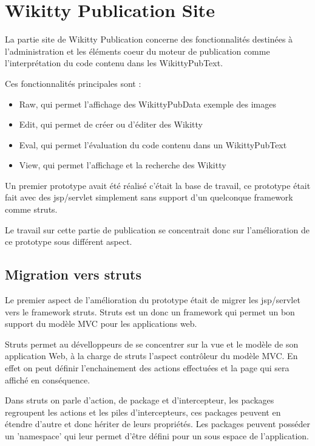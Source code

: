\section{Wikitty Publication Site}

La partie site de Wikitty Publication concerne des fonctionnalités
destinées à l'administration et les éléments coeur du moteur de publication
comme l'interprétation du code contenu dans les WikittyPubText. 

Ces fonctionnalités principales sont :
\begin{itemize}
\item Raw, qui permet l'affichage des WikittyPubData exemple des images
\item Edit, qui permet de créer ou d'éditer des Wikitty
\item Eval, qui permet l'évaluation du code contenu dans un WikittyPubText
\item View, qui permet l'affichage et la recherche des Wikitty
\end{itemize}

Un premier prototype avait été réalisé c'était la base de travail, ce prototype
était fait avec des jsp/servlet simplement sans support d'un quelconque
framework comme struts.

Le travail sur cette partie de publication se concentrait donc sur
l'amélioration de ce prototype sous différent aspect.


\subsection{Migration vers struts}

Le premier aspect de l'amélioration du prototype était de migrer les jsp/servlet
vers le framework struts. Struts est un donc un framework qui permet un bon
support du modèle MVC pour les applications web.

Struts permet au dévelloppeurs de se concentrer sur la vue et le modèle de son
application Web, à la charge de struts l'aspect contrôleur du modèle MVC. En
effet on peut définir l'enchainement des actions effectuées et la page qui sera
affiché en conséquence.

Dans struts on parle d'action, de package et d'intercepteur, les packages
regroupent les actions et les piles d'intercepteurs, ces packages peuvent en
étendre d'autre et donc hériter de leurs propriétés. Les packages peuvent
posséder un 'namespace' qui leur permet d'être défini pour un sous espace de
l'application.

